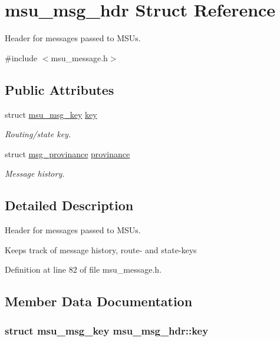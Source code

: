 \hypertarget{structmsu__msg__hdr}{\section{msu\-\_\-msg\-\_\-hdr Struct Reference}
\label{structmsu__msg__hdr}
}


Header for messages passed to M\-S\-Us.  




{\ttfamily \#include $<$msu\-\_\-message.\-h$>$}

\subsection*{Public Attributes}
\begin{DoxyCompactItemize}
\item 
struct \hyperlink{structmsu__msg__key}{msu\-\_\-msg\-\_\-key} \hyperlink{structmsu__msg__hdr_a4fdc31ee60340dd9b2550df651fb185a}{key}
\begin{DoxyCompactList}\small\item\em Routing/state key. \end{DoxyCompactList}\item 
struct \hyperlink{structmsg__provinance}{msg\-\_\-provinance} \hyperlink{structmsu__msg__hdr_ab64c7b4c508dd04d23bbd940cd6dabea}{provinance}
\begin{DoxyCompactList}\small\item\em Message history. \end{DoxyCompactList}\end{DoxyCompactItemize}


\subsection{Detailed Description}
Header for messages passed to M\-S\-Us. 

Keeps track of message history, route-\/ and state-\/keys 

Definition at line 82 of file msu\-\_\-message.\-h.



\subsection{Member Data Documentation}
\hypertarget{structmsu__msg__hdr_a4fdc31ee60340dd9b2550df651fb185a}{
\subsubsection[{key}]{\setlength{\rightskip}{0pt plus 5cm}struct {\bf msu\-\_\-msg\-\_\-key} msu\-\_\-msg\-\_\-hdr\-::key}}\label{structmsu__msg__hdr_a4fdc31ee60340dd9b2550df651fb185a}


